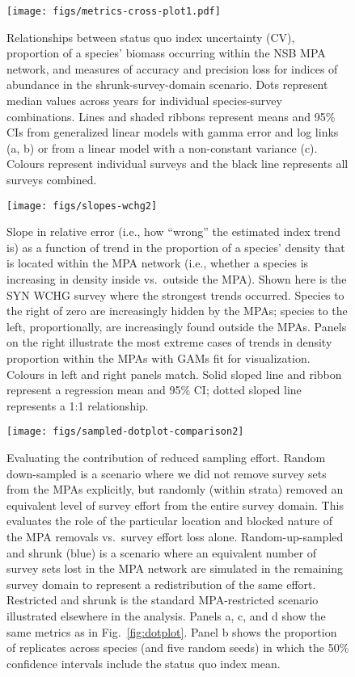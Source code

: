 \documentclass[12pt]{article}
\begin{document}
\begin{figure}[htb]
  \centering
  \texttt{[image: figs/metrics-cross-plot1.pdf]}
  \caption{Relationships between status quo index uncertainty (CV), proportion of a species' biomass occurring within the NSB MPA network, and measures of accuracy and precision loss for indices of abundance in the shrunk-survey-domain scenario. Dots represent median values across years for individual species-survey combinations. Lines and shaded ribbons represent means and 95\% CIs from generalized linear models with gamma error and log links (a, b) or from a linear model with a non-constant variance (c). Colours represent individual surveys and the black line represents all surveys combined.}
  \label{fig:covariates}
\end{figure}

\clearpage

\begin{figure}[htb]
    \centering
    \texttt{[image: figs/slopes-wchg2]}
    \caption{Slope in relative error (i.e., how ``wrong'' the estimated index trend is) as a function of trend in the proportion of a species' density that is located within the MPA network (i.e., whether a species is increasing in density inside vs.\ outside the MPA). Shown here is the SYN WCHG survey where the strongest trends occurred. Species to the right of zero are increasingly hidden by the MPAs; species to the left, proportionally, are increasingly found outside the MPAs. Panels on the right illustrate the most extreme cases of trends in density proportion within the MPAs with GAMs fit for visualization. Colours in left and right panels match. Solid sloped line and ribbon represent a regression mean and 95\% CI; dotted sloped line represents a 1:1 relationship.}
    \label{fig:slopes}
\end{figure}

\clearpage

\begin{figure}[htb]
    \centering
    \texttt{[image: figs/sampled-dotplot-comparison2]}
    \caption{Evaluating the contribution of reduced sampling effort. Random down-sampled is a scenario where we did not remove survey sets from the MPAs explicitly, but randomly (within strata) removed an equivalent level of survey effort from the entire survey domain. This evaluates the role of the particular location and blocked nature of the MPA removals vs.\ survey effort loss alone. Random-up-sampled and shrunk (blue) is a scenario where an equivalent number of survey sets lost in the MPA network are simulated in the remaining survey domain to represent a redistribution of the same effort. Restricted and shrunk is the standard MPA-restricted scenario illustrated elsewhere in the analysis. Panels a, c, and d show the same metrics as in Fig.~\ref{fig:dotplot}. Panel b shows the proportion of replicates across species (and five random seeds) in which the 50\% confidence intervals include the status quo index mean.}
    \label{fig:sampling}
\end{figure}
\end{document}
